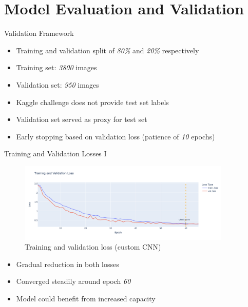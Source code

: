 \documentclass{beamer}
\begin{document}
\section{Model Evaluation and Validation}
\begin{frame}{Validation Framework}
    \begin{itemize}
        \item Training and validation split of \textit{80\%} and \textit{20\%} respectively
        \item Training set: \textit{3800} images
        \item Validation set: \textit{950} images
        \item Kaggle challenge does not provide test set labels
        \item Validation set served as proxy for test set
        \item Early stopping based on validation loss (patience of \textit{10} epochs)
    \end{itemize}
\end{frame}

\begin{frame}{Training and Validation Losses I}
    \begin{figure}
        \centering
        \includegraphics[width=0.9\textwidth]{../resources/custom_cnn/loss.png}
        \caption{Training and validation loss (custom CNN)}\label{fig:custom-cnn-loss}
    \end{figure}
    \begin{itemize}
        \item Gradual reduction in both losses
        \item Converged steadily around epoch \textit{60}
        \item Model could benefit from increased capacity
    \end{itemize}
\end{frame}
\end{document}
